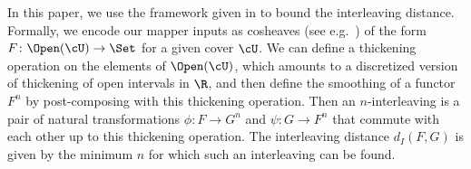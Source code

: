 In this paper, we use the framework given in \cite{chambers2023bounding} to bound the interleaving distance.
Formally, we encode our mapper inputs as cosheaves (see e.g.~\cite{curry2013sheaves, riehl2017category}) of the form $F\colon \Open(\cU) \rightarrow \Set$ for a given cover $\cU$.
We can define a thickening operation on the elements of $\Open(\cU)$,  which amounts to a discretized version of thickening of open intervals in $\R$, and then define the smoothing of a functor $F^n$ by post-composing with this thickening operation. 
Then an $n$-interleaving is a pair of natural transformations $\phi\colon F \to G^n$ and $\psi\colon G \to F^n$ that commute with each other up to this thickening operation. 
The interleaving distance $d_I(F,G)$ is given by the minimum $n$ for which such an interleaving can be found. 


